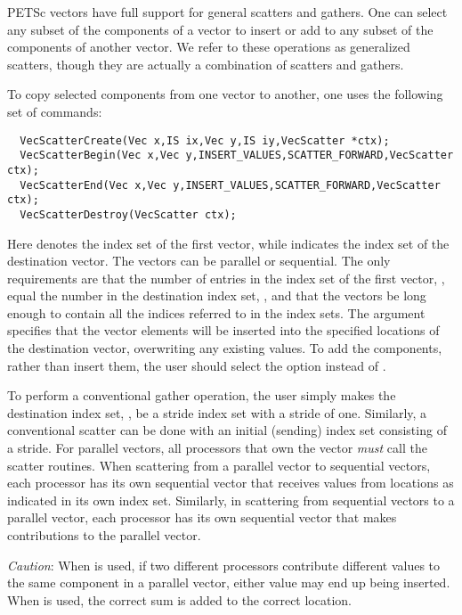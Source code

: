 PETSc vectors have full support for general scatters and 
gathers. One can select any subset of the components of a vector to
insert or add to any subset of the components of another vector.
We refer to these operations as generalized scatters, though they are 
actually a combination of scatters and gathers. 

 
 
 
To copy selected components from one vector 
to another, one uses the following set of commands:
\begin{verbatim}
  VecScatterCreate(Vec x,IS ix,Vec y,IS iy,VecScatter *ctx);
  VecScatterBegin(Vec x,Vec y,INSERT_VALUES,SCATTER_FORWARD,VecScatter ctx);
  VecScatterEnd(Vec x,Vec y,INSERT_VALUES,SCATTER_FORWARD,VecScatter ctx);
  VecScatterDestroy(VecScatter ctx);
\end{verbatim} 
Here  denotes the index set of the first vector, while  indicates the index set of the destination vector.  The vectors
can be parallel or sequential. The only requirements are that the
number of entries in the index set of the first vector, ,
equal the number in the destination index set, , and that the
vectors be long enough to contain all the indices referred to in the
index sets.  The argument  specifies that the
vector elements will be inserted into the specified locations of the
destination vector, overwriting any existing values.  To add the
components, rather than insert them, the user should select the option
  instead of .

To perform a conventional gather operation, the user simply makes
 the destination index set, 
, be a stride index set with a stride of one.  Similarly, a 
conventional scatter can be done with an initial (sending) index set 
consisting of a stride.  For parallel vectors, all processors that own 
the vector {\em must} call the scatter routines. When scattering from a 
parallel vector to sequential vectors, each processor has its own sequential 
vector that receives values from locations as indicated in its own 
index set. Similarly, in scattering
from sequential vectors to a parallel vector, each processor has its
own sequential vector that makes contributions to the parallel vector.

{\em Caution}: When  is used, if two different
processors contribute different values to the same component in a
parallel vector, either value may end up being inserted. When  is used, the correct sum is added to the correct
location.

